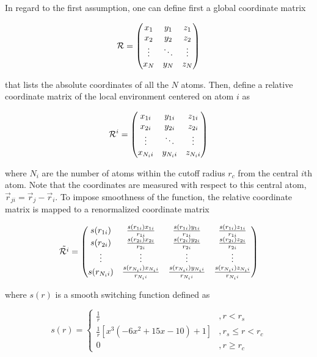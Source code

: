 In regard to the first assumption, one can define first a global coordinate
matrix

\begin{equation}
    \mathcal{R} =  \mqty( x_1 & y_1 & z_1 \\ x_2 & y_2 & z_2 \\ \vdots & \ddots
    &
    \vdots \\
    x_N & y_N & z_N)
\end{equation}

that lists the absolute coordinates of all the $N$ atoms. Then, define a
relative
coordinate matrix of the local environment centered on atom  $i$ as

\begin{equation}
    \mathcal{R}^i =  \mqty( x_{1i} & y_{1i} & z_{1i} \\ x_{2i} & y_{2i} &
    z_{2i}
    \\ \vdots & \ddots
    &
    \vdots \\
    x_{N_i i} & y_{N_i i} & z_{N_i i})
\end{equation}

where $N_i$ are the number of atoms within the cutoff radius $r_c$ from the
central $i$th atom. Note that the coordinates are measured with respect to this
central atom, $\vec{r}_{ji} = \vec{r}_{j}- \vec{r}_{i}$. To impose smoothness
of the function, the relative coordinate matrix is mapped to  a renormalized
coordinate matrix

\begin{equation}
    \tilde{\mathcal{R}^i} =  \mqty( s(r_{1i}) &
    \frac{s(r_{1i}) x_{1i}}{r_{1i}}
    &	 \frac{s(r_{1i}) y_{1i}}{r_{1i}} &
    \frac{s(r_{1i}) z_{1i}}{r_{1i}} \\
    s(r_{2i}) &
    \frac{s(r_{2i}) x_{2i}}{r_{2i}}
    &	 \frac{s(r_{2i}) y_{2i}}{r_{2i}} &
    \frac{s(r_{2i}) z_{2i}}{r_{2i}}
    \\ \vdots & \vdots & \vdots
    &
    \vdots \\
    s(r_{N_i i}) &
    \frac{s(r_{N_i i}) x_{N_i i}}{r_{N_i i}}
    &	 \frac{s(r_{N_i i}) y_{N_i i}}{r_{N_i i}} &
    \frac{s(r_{N_i i}) z_{N_i i}}{r_{N_i i}} )
\end{equation}

where $s(r)$ is a smooth switching function defined as

\begin{equation}
    s(r) = \begin{cases}
        \frac{1}{r}                                   & , r   < r_s        \\
        \frac{1}{r} \left[x^3 (-6x^2+15x-10)+1\right] & , r_s \leq r < r_c \\
        0                                             & , r   \geq r_c
    \end{cases}
\end{equation}

